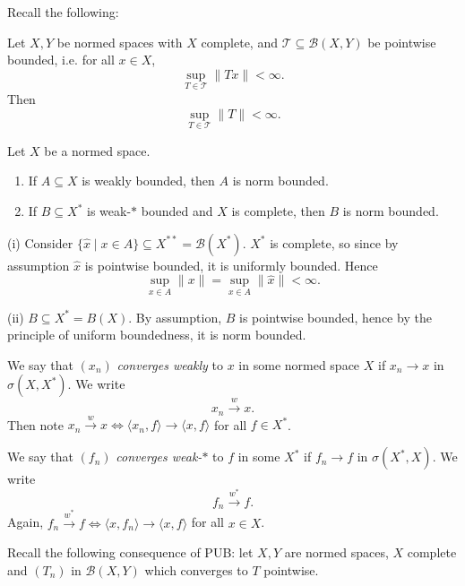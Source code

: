 \documentclass[12pt]{article}
\begin{document}
Recall the following:
\begin{lemma}
	Let $X, Y$ be normed spaces with $X$ complete, and $\mathcal{T} \subseteq \mathcal{B}(X, Y)$ be pointwise bounded, i.e. for all $x \in X$,
	\[
	\sup_{T \in \mathcal{T}} \|Tx\| < \infty.
	\]
	Then
	\[
	\sup_{T \in \mathcal{T}}\|T\| < \infty.
	\]
\end{lemma}

\begin{proposition}
	Let $X$ be a normed space.
	\begin{enumerate}[\normalfont(i)]
		\item If $A \subseteq X$ is weakly bounded, then $A$ is norm bounded.
		\item If $B \subseteq X^{\ast}$ is weak-$\ast$ bounded and $X$ is complete, then $B$ is norm bounded.
	\end{enumerate}
\end{proposition}

\begin{proofbox}
	

	(i) Consider $\{\hat x \mid x \in A\} \subseteq X^{\ast\ast} = \mathcal{B}(X^{\ast})$. $X^{\ast}$ is complete, so since by assumption $\hat x$ is pointwise bounded, it is uniformly bounded. Hence
	\[
	\sup_{x \in A} \|x\| = \sup_{x \in A} \|\hat x\| < \infty.
	\]

	(ii) $B \subseteq X^{\ast} = B(X)$. By assumption, $B$ is pointwise bounded, hence by the principle of uniform boundedness, it is norm bounded.
\end{proofbox}

\begin{definition}
	We say that $(x_n)$ \emph{converges weakly} to $x$ in some normed space $X$ if $x_n \to x$ in $\sigma(X, X^{\ast})$. We write
	\[
	x_n \overset w \to x.
	\]
	Then note $x_n \overset w\to x \iff \langle x_n, f\rangle \to \langle x, f\rangle$ for all $f \in X^{\ast}$.

	We say that $(f_n)$ \emph{converges weak-$\ast$} to $f$ in some $X^{\ast}$ if $f_n \to f$ in $\sigma(X^{\ast}, X)$. We write
	\[
		f_n \overset {w^{\ast}}\to f.
	\]
	Again, $f_n \overset{w^{\ast}}\to f \iff  \langle x, f_n \rangle \to \langle x, f\rangle$ for all $x \in X$.
\end{definition}

Recall the following consequence of PUB: let $X, Y$ are normed spaces, $X$ complete and $(T_n)$ in $\mathcal{B}(X, Y)$ which converges to $T$ pointwise.
\end{document}

